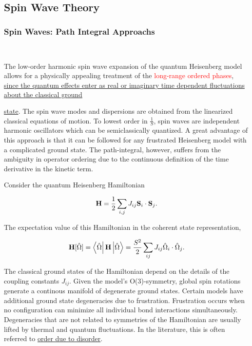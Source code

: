 \clearpage

\subsection{\textbf{Spin Wave Theory}}

\subsubsection{Spin Waves: Path Integral Approachs}

\blanky \\

\begin{tcolorbox}[colback = yellow, title = Physical Context]

The low-order harmonic spin wave expansion of the quantum Heisenberg model allows for a physically appealing treatment of the \textcolor{red}{long-range ordered phases}, \underline{since the quantum effects enter as real or imaginary}\underline{ time dependent fluctuations about the classical ground}

\underline{state}. The spin wave modes and dispersions are obtained from the linearized classical equations of motion. To lowest order in $\frac{1}{S}$, spin waves are independent harmonic oscillators which can be semiclassically quantized. A great advantage of this approach is that it can be followed for any frustrated Heisenberg model with a complicated ground state. The path-integral, however, suffers from the ambiguity in operator ordering due to the continuous definition of the time derivative in the kinetic term. 

\end{tcolorbox}

Consider the quantum Heisenberg Hamiltonian 

$$
    {\bf H} = \frac{1}{2} \sum_{i,j} J_{ij} {\bf S}_i \cdot {\bf S}_j. 
$$

The expectation value of this Hamiltonian in the coherent state representation, 

\begin{equation}
    {\bf H}[\hat{\Omega}] = \bra{\hat{\Omega}} {{\bf H}} \ket{\hat{\Omega}} = \frac{S^2}{2} \sum_{ij} J_{ij} \hat{\Omega}_i \cdot \hat{\Omega}_j.
\end{equation}

The classical ground states of the Hamiltonian depend on the details of the coupling constants $J_{ij}$. Given the model's O(3)-symmetry, global spin rotations generate a continous manifold of degenerate ground states. Certain models have additional ground state degeneracies due to frustration. Frustration occurs when no configuration can minimize all individual bond interactions simultaneously. Degeneracies that are not related to symmetries of the Hamiltonian are usually lifted by thermal and quantum fluctuations. In the literature, this is often referred to \underline{order due to disorder}. \\

